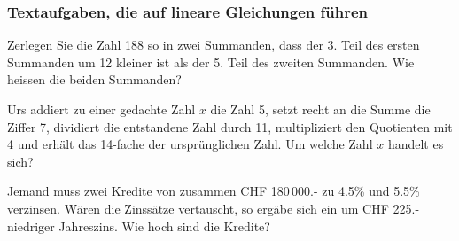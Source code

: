 

\subsubsection{Textaufgaben, die auf lineare Gleichungen führen}

  Zerlegen Sie die Zahl 188 so in zwei Summanden, dass der 3. Teil des
  ersten Summanden um 12 kleiner ist als der 5. Teil des zweiten
  Summanden. Wie heissen die beiden Summanden?



Urs addiert zu einer gedachte Zahl $x$ die Zahl 5, setzt recht
  an die Summe die Ziffer 7, dividiert die entstandene Zahl durch 11,
  multipliziert den Quotienten mit 4 und erhält das 14-fache der
  ursprünglichen Zahl. Um welche Zahl $x$ handelt es sich?


Jemand muss zwei Kredite von zusammen CHF 180\,000.- zu 4.5\%
  und 5.5\% verzinsen. Wären die Zinssätze vertauscht, so ergäbe sich
  ein um CHF 225.- niedriger Jahreszins. Wie hoch sind die Kredite?


